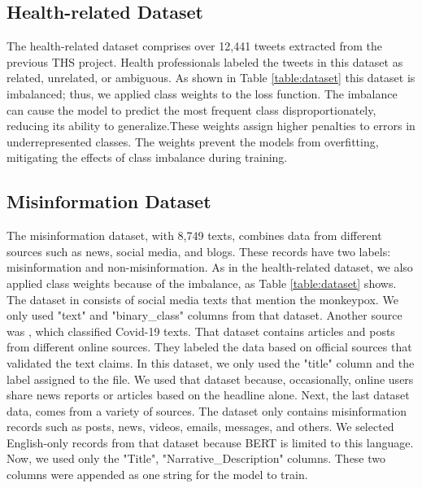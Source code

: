 \subsection{Health-related Dataset}
The health-related dataset comprises over 12,441 tweets extracted from the previous THS project.  Health professionals labeled the tweets in this dataset as related, unrelated, or ambiguous. As shown in Table \ref{table:dataset} this dataset is imbalanced; thus, we applied class weights to the loss function. The imbalance can cause the model to predict the most frequent class disproportionately, reducing its ability to generalize.These weights assign higher penalties to errors in underrepresented classes. The weights prevent the models from overfitting, mitigating the effects of class imbalance during training.



\subsection{Misinformation Dataset}
The misinformation dataset, with 8,749 texts, combines data from different sources such as news, social media, and blogs. These records have two labels: misinformation and non-misinformation. As in the health-related dataset, we also applied class weights because of the imbalance, as Table \ref{table:dataset} shows. The dataset in \cite{stephencrone2022} consists of social media texts that mention the monkeypox. We only used "text" and "binary\_class" columns from that dataset. Another source was \cite{coviddata}, which classified Covid-19 texts. That dataset contains articles and posts from different online sources. They labeled the data based on official sources that validated the text claims. In this dataset, we only used the "title" column and the label assigned to the file. We used that dataset because, occasionally, online users share news reports or articles based on the headline alone. Next, the last dataset \cite{covidunesco} data, comes from a variety of sources. The dataset only contains misinformation records such as posts, news, videos, emails, messages, and others. We selected English-only records from that dataset because BERT is limited to this language. Now, we used only the "Title", "Narrative\_Description" columns. These two columns were appended as one string for the model to train. 


